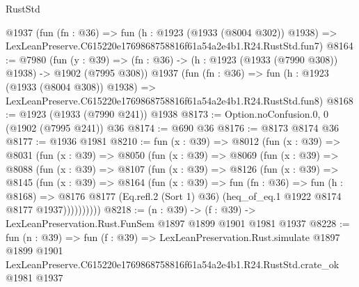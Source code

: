 \begin{lexlean}{RustStd}
\begin{coremodule}
    @1937
    (fun (fn : @36) =>
    fun (h : @1923 (@1933 (@8004 @302)) @1938) =>
    LexLeanPreserve.C615220e1769868758816f61a54a2e4b1.R24.RustStd.fun7)
@8164 := @7980
    (fun (y : @39) => (fn : @36) -> (h : @1923 (@1933 (@7990 @308)) @1938) -> @1902 (@7995 @308))
    @1937
    (fun (fn : @36) =>
    fun (h : @1923 (@1933 (@8004 @308)) @1938) =>
    LexLeanPreserve.C615220e1769868758816f61a54a2e4b1.R24.RustStd.fun8)
@8168 := @1923 (@1933 (@7990 @241)) @1938
@8173 := Option.noConfusion.{0, 0} (@1902 (@7995 @241)) @36
@8174 := @690 @36
@8176 := @8173 @8174 @36
@8177 := @1936 @1981
@8210 := fun (x : @39) =>
  @8012
    (fun (x : @39) =>
    @8031
      (fun (x : @39) =>
      @8050
        (fun (x : @39) =>
        @8069
          (fun (x : @39) =>
          @8088
            (fun (x : @39) =>
            @8107
              (fun (x : @39) =>
              @8126
                (fun (x : @39) =>
                @8145
                  (fun (x : @39) =>
                  @8164
                    (fun (x : @39) =>
                    fun (fn : @36) =>
                    fun (h : @8168) =>
                    @8176
                      @8177
                      (Eq.refl.{2} (Sort 1) @36)
                      (heq_of_eq.{1} @1922 @8174 @8177 @1937))))))))))
@8218 := (n : @39) -> (f : @39) -> LexLeanPreservation.Rust.FunSem @1897 @1899 @1901 @1981 @1937
@8228 := fun (n : @39) =>
  fun (f : @39) =>
  LexLeanPreservation.Rust.simulate
    @1897
    @1899
    @1901
    LexLeanPreserve.C615220e1769868758816f61a54a2e4b1.R24.RustStd.crate_ok
    @1981
    @1937
\end{coremodule}
\end{lexlean}
